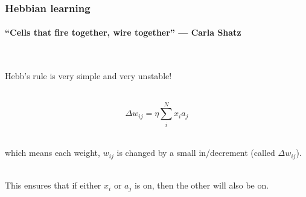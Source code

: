 \documentclass{beamer}
\begin{document}
\begin{frame}
\frametitle{Hebbian learning}
\framesubtitle{``Cells that fire together, wire together'' --- Carla Shatz }
  \begin{columns}[T]
    \begin{column}{.5\textwidth}
    \ \\ 
    Hebb's rule is very simple and very unstable!
    
      \ \\

      \begin{equation*}
      \Delta w_{ij} = \eta\sum^N_i   x_i a_j
      \end{equation*}
      
      \ \\
      
      which means each weight, $w_{ij}$ is changed by a small in/decrement (called $\Delta w_{ij}$).
      
      \ \\ 
      
      This ensures that if either $x_i$ or $a_j$ is on, then the other will also be on.


\end{column}
\end{columns}
\end{frame}
\end{document}

